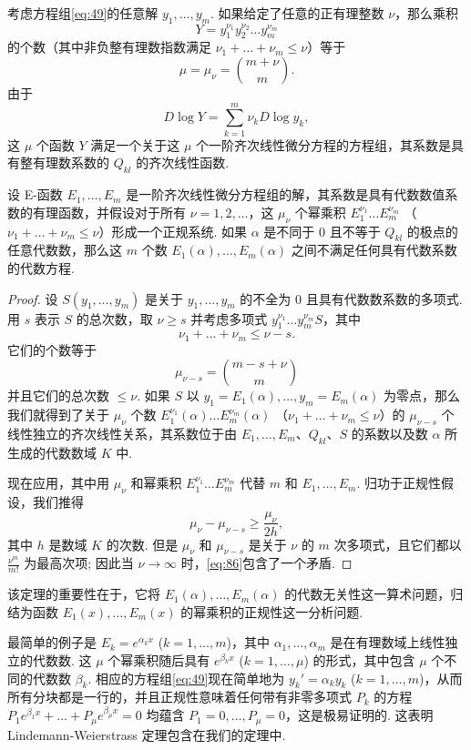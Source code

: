 考虑方程组\eqref{eq:49}的任意解 $y_1, \dots, y_m$. 如果给定了任意的正有理整数 $\nu$，那么乘积
\[Y = y_1^{\nu_1} y_2^{\nu_2} \dots y_m^{\nu_m}\]
的个数（其中非负整有理数指数满足 $\nu_1 + \dots + \nu_m \le \nu$）等于
\[\mu = \mu_{\nu} = \binom{m+\nu}{m}.\]
由于
\[D \log Y = \sum_{k=1}^{m} \nu_k D \log y_k,\]
这 $\mu$ 个函数 $Y$ 满足一个关于这 $\mu$ 个一阶齐次线性微分方程的方程组，其系数是具有整有理数系数的 $Q_{kl}$ 的齐次线性函数.

\begin{mythm*}{}
设 E-函数 $E_1, \dots, E_m$ 是一阶齐次线性微分方程组的解，其系数是具有代数数值系数的有理函数，并假设对于所有 $\nu = 1, 2, \dots$，这 $\mu_{\nu}$ 个幂乘积 $E_1^{\nu_1} \dots E_m^{\nu_m}$ （$\nu_1 + \dots + \nu_m \le \nu$）形成一个正规系统. 如果 $\alpha$ 是不同于 0 且不等于 $Q_{kl}$ 的极点的任意代数数，那么这 $m$ 个数 $E_1(\alpha), \dots, E_m(\alpha)$ 之间不满足任何具有代数系数的代数方程.
\end{mythm*}

\begin{proof}
设 $S(y_1, \dots, y_m)$ 是关于 $y_1, \dots, y_m$ 的不全为 0 且具有代数数系数的多项式. 用 $s$ 表示 $S$ 的总次数，取 $\nu \ge s$ 并考虑多项式 $y_1^{\nu_1} \dots y_m^{\nu_m} S$，其中
\[\nu_1 + \dots + \nu_m \le \nu - s.\]
它们的个数等于
\[\mu_{\nu-s} = \binom{m-s+\nu}{m}\]
并且它们的总次数 $\le \nu$. 如果 $S$ 以 $y_1 = E_1(\alpha), \dots, y_m = E_m(\alpha)$ 为零点，那么我们就得到了关于 $\mu_{\nu}$ 个数 $E_1^{\nu_1}(\alpha) \dots E_m^{\nu_m}(\alpha)$ （$\nu_1 + \dots + \nu_m \le \nu$）的 $\mu_{\nu-s}$ 个线性独立的齐次线性关系，其系数位于由 $E_1, \dots, E_m$、$Q_{kl}$、$S$ 的系数以及数 $\alpha$ 所生成的代数数域 $K$ 中.

现在应用，其中用 $\mu_{\nu}$ 和幂乘积 $E_1^{\nu_1} \dots E_m^{\nu_m}$ 代替 $m$ 和 $E_1, \dots, E_m$. 归功于正规性假设，我们推得
\begin{equation}
\mu_{\nu} - \mu_{\nu-s} \ge \frac{\mu_{\nu}}{2h}, \tag{86}\label{eq:86}
\end{equation}
其中 $h$ 是数域 $K$ 的次数. 但是 $\mu_{\nu}$ 和 $\mu_{\nu-s}$ 是关于 $\nu$ 的 $m$ 次多项式，且它们都以 $\frac{\nu^m}{m!}$ 为最高次项; 因此当 $\nu \to \infty$ 时，\eqref{eq:86}包含了一个矛盾.
\end{proof}

该定理的重要性在于，它将 $E_1(\alpha), \dots, E_m(\alpha)$ 的代数无关性这一算术问题，归结为函数 $E_1(x), \dots, E_m(x)$ 的幂乘积的正规性这一分析问题.

最简单的例子是 $E_k = e^{\alpha_k x}$ ($k=1, \dots, m$)，其中 $\alpha_1, \dots, \alpha_m$ 是在有理数域上线性独立的代数数. 这 $\mu$ 个幂乘积随后具有 $e^{\beta_k x}$ ($k=1, \dots, \mu$) 的形式，其中包含 $\mu$ 个不同的代数数 $\beta_k$. 相应的方程组\eqref{eq:49}现在简单地为 $y_k' = \alpha_k y_k$ ($k=1, \dots, m$)，从而所有分块都是一行的，并且正规性意味着任何带有非零多项式 $P_k$ 的方程 $P_1 e^{\beta_1 x} + \dots + P_{\mu} e^{\beta_{\mu} x} = 0$ 均蕴含 $P_1 = 0, \dots, P_{\mu} = 0$，这是极易证明的. 这表明 Lindemann-Weierstrass 定理包含在我们的定理中.

